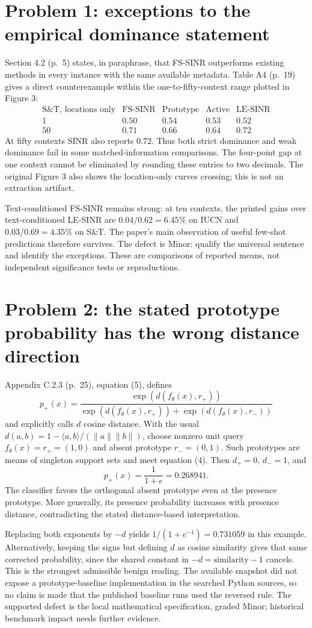 \documentclass[10pt]{article}
\begin{document}
\section*{Problem 1: exceptions to the empirical dominance statement}
Section 4.2 (p. 5) states, in paraphrase, that FS-SINR outperforms existing methods in every instance with the same available metadata. Table A4 (p. 19) gives a direct counterexample within the one-to-fifty-context range plotted in Figure 3: \[\begin{array}{c|rrrr}
\text{S\&T, locations only} &\text{FS-SINR}&\text{Prototype}&\text{Active}&\text{LE-SINR}\\
\hline
1&0.50&0.54&0.53&0.52\\
50&0.71&0.66&0.64&0.72
\end{array}\] At fifty contexts SINR also reports \(0.72\). Thus both strict dominance and weak dominance fail in some matched-information comparisons. The four-point gap at one context cannot be eliminated by rounding these entries to two decimals. The original Figure 3 also shows the location-only curves crossing; this is not an extraction artifact.\par
Text-conditioned FS-SINR remains strong: at ten contexts, the printed gains over text-conditioned LE-SINR are \(0.04/0.62=6.45\%\) on IUCN and \(0.03/0.69=4.35\%\) on S\&T. The paper’s main observation of useful few-shot predictions therefore survives. The defect is Minor: qualify the universal sentence and identify the exceptions. These are comparisons of reported means, not independent significance tests or reproductions.\par
\section*{Problem 2: the stated prototype probability has the wrong distance direction}
Appendix C.2.3 (p. 25), equation (5), defines \[p_+(x)=\frac{\exp(d(f_\theta(x),r_+))}
 {\exp(d(f_\theta(x),r_+))+\exp(d(f_\theta(x),r_-))}\] and explicitly calls \(d\) cosine distance. With the usual \(d(a,b)=1-\langle a,b\rangle/(\|a\|\|b\|)\), choose nonzero unit query \(f_\theta(x)=r_+=(1,0)\) and absent prototype \(r_-=(0,1)\). Such prototypes are means of singleton support sets and meet equation (4). Then \(d_+=0\), \(d_-=1\), and \[p_+(x)=\frac{1}{1+e}=0.268941.\] The classifier favors the orthogonal absent prototype even at the presence prototype. More generally, its presence probability increases with presence distance, contradicting the stated distance-based interpretation.\par
Replacing both exponents by \(-d\) yields \(1/(1+e^{-1})=0.731059\) in this example. Alternatively, keeping the signs but defining \(d\) as cosine similarity gives that same corrected probability, since the shared constant in \(-d=\text{similarity}-1\) cancels. This is the strongest admissible benign reading. The available snapshot did not expose a prototype-baseline implementation in the searched Python sources, so no claim is made that the published baseline runs used the reversed rule. The supported defect is the local mathematical specification, graded Minor; historical benchmark impact needs further evidence.\par
\end{document}

